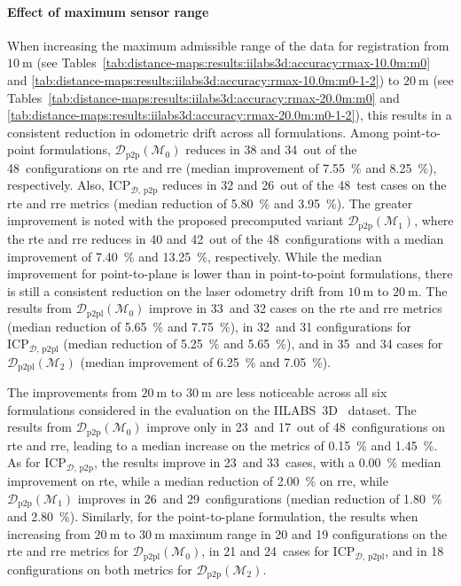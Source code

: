 \paragraph{Effect of maximum sensor range}
When increasing the maximum admissible range of the data for registration from
$\SI{10}{\metre}$
(see Tables~\ref{tab:distance-maps:results:iilabs3d:accuracy:rmax-10.0m:m0} and
\ref{tab:distance-maps:results:iilabs3d:accuracy:rmax-10.0m:m0-1-2})
to $\SI{20}{\metre}$
(see Tables~\ref{tab:distance-maps:results:iilabs3d:accuracy:rmax-20.0m:m0} and
\ref{tab:distance-maps:results:iilabs3d:accuracy:rmax-20.0m:m0-1-2}), this
results in a consistent reduction in odometric drift across all formulations.
Among point-to-point formulations, $\mathcal{D}_\mathrm{p2p}(\mathcal{M}_0)$
reduces in 38 and 34~out of the 48~configurations on \gls{rte} and \gls{rre}
(median improvement of \SI{7.55}{\percent} and \SI{8.25}{\percent}),
respectively. Also, $\mathrm{ICP}_{\mathcal{D},\,\mathrm{p2p}}$ reduces in 32
and 26~out of the 48~test cases on the \gls{rte} and \gls{rre} metrics
(median reduction of \SI{5.80}{\percent} and \SI{3.95}{\percent}).
The greater improvement is noted with the proposed precomputed variant
$\mathcal{D}_\mathrm{p2p}(\mathcal{M}_1)$, where the \gls{rte} and \gls{rre}
reduces in 40 and 42~out of the 48~configurations with a median improvement of
\SI{7.40}{\percent} and \SI{13.25}{\percent}, respectively.
While the median improvement for point-to-plane is lower than in point-to-point
formulations, there is still a consistent reduction on the laser odometry
drift from $\SI{10}{\metre}$ to $\SI{20}{\metre}$.
The results from $\mathcal{D}_\mathrm{p2pl}(\mathcal{M}_0)$ improve
in 33~and 32 cases on the \gls{rte} and \gls{rre} metrics
(median reduction of \SI{5.65}{\percent} and \SI{7.75}{\percent}),
in 32~and 31 configurations for $\mathrm{ICP}_{\mathcal{D},\,\mathrm{p2pl}}$
(median reduction of \SI{5.25}{\percent} and \SI{5.65}{\percent}), and
in 35~and 34 cases for $\mathcal{D}_\mathrm{p2pl}(\mathcal{M}_2)$
(median improvement of \SI{6.25}{\percent} and \SI{7.05}{\percent}).

The improvements from $\SI{20}{\metre}$ to $\SI{30}{\metre}$ are less noticeable
across all six formulations considered in the evaluation on
the IILABS~3D~\cite{ribeiro:access:2025} dataset.
The results from $\mathcal{D}_\mathrm{p2p}(\mathcal{M}_0)$ improve only
in 23~and 17~out of 48~configurations on \gls{rte} and \gls{rre}, leading to a
median increase on the metrics of \SI{0.15}{\percent} and \SI{1.45}{\percent}.
As for $\mathrm{ICP}_{\mathcal{D},\,\mathrm{p2p}}$, the results improve in
23~and 33~cases, with a \SI{0.00}{\percent} median improvement on \gls{rte},
while a median reduction of \SI{2.00}{\percent} on \gls{rre}, while
$\mathcal{D}_\mathrm{p2p}(\mathcal{M}_1)$ improves in 26~and 29~configurations
(median reduction of \SI{1.80}{\percent} and \SI{2.80}{\percent}).
Similarly, for the point-to-plane formulation, the results when increasing from
$\SI{20}{\metre}$ to $\SI{30}{\metre}$ maximum range in 20 and 19 configurations
on the \gls{rte} and \gls{rre} metrics for
$\mathcal{D}_\mathrm{p2pl}(\mathcal{M}_0)$,
in 21 and 24~cases for $\mathrm{ICP}_{\mathcal{D},\,\mathrm{p2pl}}$, and
in 18 configurations on both metrics for
$\mathcal{D}_\mathrm{p2p}(\mathcal{M}_2)$.

